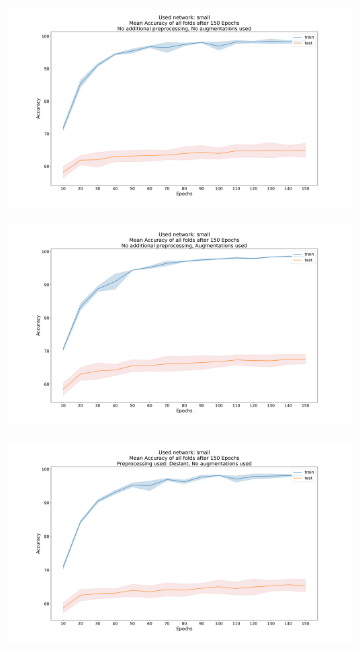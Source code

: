 \documentclass{article}
\begin{document}
\begin{minipage}[!h]{1\linewidth}
\vspace{-30mm}

\begin{figure}[H]
	\begin{adjustwidth}{-8em}{-8em}
	
	\centering
    \begin{subfigure}{0.7\textwidth}
        \centering
        \includegraphics[width=\textwidth]{Standard_small_150_acc}
    \end{subfigure}
    \begin{subfigure}{0.7\textwidth}
        \centering
        \includegraphics[width=\textwidth]{Standard_small_150_augmentations_acc}
    \end{subfigure}
    \begin{subfigure}{0.7\textwidth}
        \centering
        \includegraphics[width=\textwidth]{Deslant_small_150_acc}

\end{subfigure}
\end{adjustwidth}
\end{figure}
\end{minipage}
\end{document}
